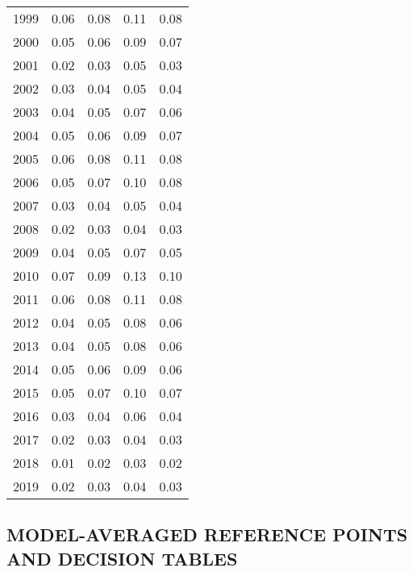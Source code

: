 \documentclass[11pt]{book}
\begin{document}
\begin{longtable}[]{@{}lrrrr@{}}
1999 & 0.06 & 0.08 & 0.11 & 0.08\tabularnewline
2000 & 0.05 & 0.06 & 0.09 & 0.07\tabularnewline
2001 & 0.02 & 0.03 & 0.05 & 0.03\tabularnewline
2002 & 0.03 & 0.04 & 0.05 & 0.04\tabularnewline
2003 & 0.04 & 0.05 & 0.07 & 0.06\tabularnewline
2004 & 0.05 & 0.06 & 0.09 & 0.07\tabularnewline
2005 & 0.06 & 0.08 & 0.11 & 0.08\tabularnewline
2006 & 0.05 & 0.07 & 0.10 & 0.08\tabularnewline
2007 & 0.03 & 0.04 & 0.05 & 0.04\tabularnewline
2008 & 0.02 & 0.03 & 0.04 & 0.03\tabularnewline
2009 & 0.04 & 0.05 & 0.07 & 0.05\tabularnewline
2010 & 0.07 & 0.09 & 0.13 & 0.10\tabularnewline
2011 & 0.06 & 0.08 & 0.11 & 0.08\tabularnewline
2012 & 0.04 & 0.05 & 0.08 & 0.06\tabularnewline
2013 & 0.04 & 0.05 & 0.08 & 0.06\tabularnewline
2014 & 0.05 & 0.06 & 0.09 & 0.06\tabularnewline
2015 & 0.05 & 0.07 & 0.10 & 0.07\tabularnewline
2016 & 0.03 & 0.04 & 0.06 & 0.04\tabularnewline
2017 & 0.02 & 0.03 & 0.04 & 0.03\tabularnewline
2018 & 0.01 & 0.02 & 0.03 & 0.02\tabularnewline
2019 & 0.02 & 0.03 & 0.04 & 0.03\tabularnewline
\bottomrule
\end{longtable}
\clearpage

\hypertarget{sec:reference-points-and-decision-tables}{%
\subsection{MODEL-AVERAGED REFERENCE POINTS AND DECISION TABLES}\label{sec:reference-points-and-decision-tables}}
\end{document}
